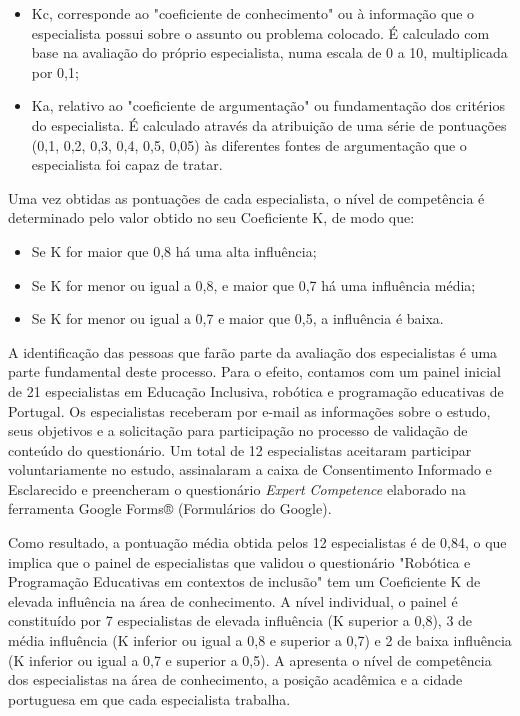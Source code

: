 \documentclass[portuguese]{textolivre}
\begin{document}
\begin{itemize}
    \item Kc, corresponde ao "coeficiente de conhecimento" ou à informação que o especialista possui sobre o assunto ou problema colocado. É calculado com base na avaliação do próprio especialista, numa escala de 0 a 10, multiplicada por 0,1;
    \item Ka, relativo ao "coeficiente de argumentação" ou fundamentação dos critérios do especialista. É calculado através da atribuição de uma série de pontuações (0,1, 0,2, 0,3, 0,4, 0,5, 0,05) às diferentes fontes de argumentação que o especialista foi capaz de tratar.
\end{itemize}

Uma vez obtidas as pontuações de cada especialista, o nível de competência é determinado pelo valor obtido no seu Coeficiente K, de modo que:

\begin{itemize}
    \item Se K for maior que 0,8 há uma alta influência;
    \item Se K for menor ou igual a 0,8, e maior que 0,7 há uma influência média;
    \item Se K for menor ou igual a 0,7 e maior que 0,5, a influência é baixa.
\end{itemize}

A identificação das pessoas que farão parte da avaliação dos especialistas é uma parte fundamental deste processo. Para o efeito, contamos com um painel inicial de 21 especialistas em Educação Inclusiva, robótica e programação educativas de Portugal. Os especialistas receberam por e-mail as informações sobre o estudo, seus objetivos e a solicitação para participação no processo de validação de conteúdo do questionário. Um total de 12 especialistas aceitaram participar voluntariamente no estudo, assinalaram a caixa de Consentimento Informado e Esclarecido e preencheram o questionário \textit{Expert Competence} \cite{cabero_almenara_utilizacion_2013} elaborado na ferramenta Google Forms® (Formulários do Google).

Como resultado, a pontuação média obtida pelos 12 especialistas é de 0,84, o que implica que o painel de especialistas que validou o questionário "Robótica e Programação Educativas em contextos de inclusão" tem um Coeficiente K de elevada influência na área de conhecimento. A nível individual, o painel é constituído por 7 especialistas de elevada influência (K superior a 0,8), 3 de média influência (K inferior ou igual a 0,8 e superior a 0,7) e 2 de baixa influência (K inferior ou igual a 0,7 e superior a 0,5). A  apresenta o nível de competência dos especialistas na área de conhecimento, a posição acadêmica e a cidade portuguesa em que cada especialista trabalha.
\end{document}
